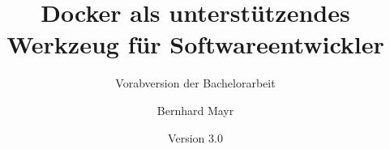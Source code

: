 \documentclass[a4paper, ngerman, bibliography=totoc]{scrreprt}  %
\title{Docker als unterstützendes Werkzeug für Softwareentwickler}
\subtitle{Vorabversion der Bachelorarbeit}
\author{Bernhard Mayr}
\date{Version 3.0}
\begin{document}
\maketitle


\tableofcontents






\listoffigures{}
\lstlistoflistings{}
\printbibliography{}
\end{document}
